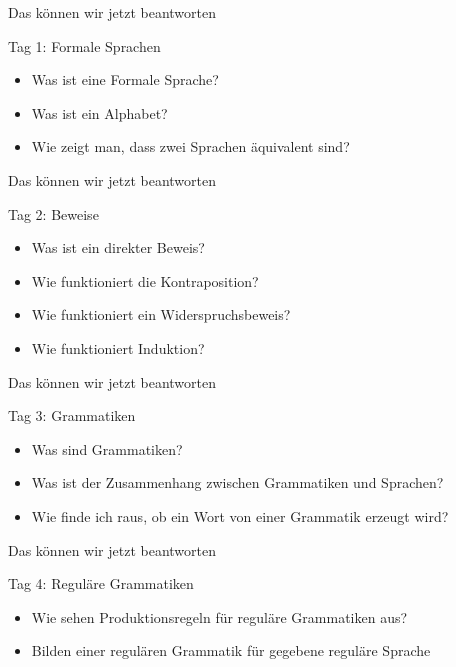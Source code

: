 \begin{frame}[fragile]{Das können wir jetzt beantworten}
	\begin{alertblock}{Tag 1: Formale Sprachen}
		\begin{itemize}
			\item Was ist eine Formale Sprache?
			\item Was ist ein Alphabet?
			\item Wie zeigt man, dass zwei Sprachen äquivalent sind?
		\end{itemize}
	\end{alertblock}
\end{frame}

\begin{frame}[fragile]{Das können wir jetzt beantworten}
    \begin{alertblock}{Tag 2: Beweise}
    \begin{itemize}
        \item Was ist ein direkter Beweis?
        \item Wie funktioniert die Kontraposition?
        \item Wie funktioniert ein Widerspruchsbeweis?
        \item Wie funktioniert Induktion?
    \end{itemize}
    \end{alertblock}
\end{frame}

\begin{frame}[fragile]{Das können wir jetzt beantworten}
    \begin{alertblock}{Tag 3: Grammatiken}
    \begin{itemize}
        \item Was sind Grammatiken?
        \item Was ist der Zusammenhang zwischen Grammatiken und Sprachen?
        \item Wie finde ich raus, ob ein Wort von einer Grammatik erzeugt wird?
    \end{itemize}
    \end{alertblock}
\end{frame}

\begin{frame}[fragile]{Das können wir jetzt beantworten}
	\begin{alertblock}{Tag 4: Reguläre Grammatiken}
		\begin{itemize}
			\item Wie sehen Produktionsregeln für reguläre Grammatiken aus?
			\item Bilden einer regulären Grammatik für gegebene reguläre Sprache
		\end{itemize}
	\end{alertblock}
\end{frame}

